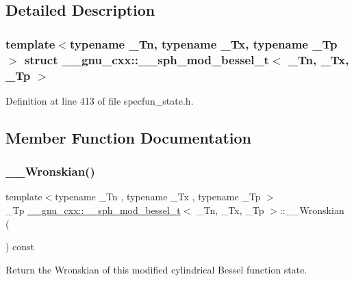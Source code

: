 \subsection{Detailed Description}
\subsubsection*{template$<$typename \+\_\+\+Tn, typename \+\_\+\+Tx, typename \+\_\+\+Tp$>$\newline
struct \+\_\+\+\_\+gnu\+\_\+cxx\+::\+\_\+\+\_\+sph\+\_\+mod\+\_\+bessel\+\_\+t$<$ \+\_\+\+Tn, \+\_\+\+Tx, \+\_\+\+Tp $>$}



Definition at line 413 of file specfun\+\_\+state.\+h.



\subsection{Member Function Documentation}
\mbox{\label{struct____gnu__cxx_1_1____sph__mod__bessel__t_afbe229c1b0faafc786c78eee38e52d0a}} 
\subsubsection{\texorpdfstring{\+\_\+\+\_\+\+Wronskian()}{\_\_Wronskian()}}
{\footnotesize\ttfamily template$<$typename \+\_\+\+Tn , typename \+\_\+\+Tx , typename \+\_\+\+Tp $>$ \\
\+\_\+\+Tp \hyperlink{struct____gnu__cxx_1_1____sph__mod__bessel__t}{\+\_\+\+\_\+gnu\+\_\+cxx\+::\+\_\+\+\_\+sph\+\_\+mod\+\_\+bessel\+\_\+t}$<$ \+\_\+\+Tn, \+\_\+\+Tx, \+\_\+\+Tp $>$\+::\+\_\+\+\_\+\+Wronskian (\begin{DoxyParamCaption}{ }\end{DoxyParamCaption}) const\hspace{0.3cm}{\ttfamily [inline]}}



Return the Wronskian of this modified cylindrical Bessel function state. 




